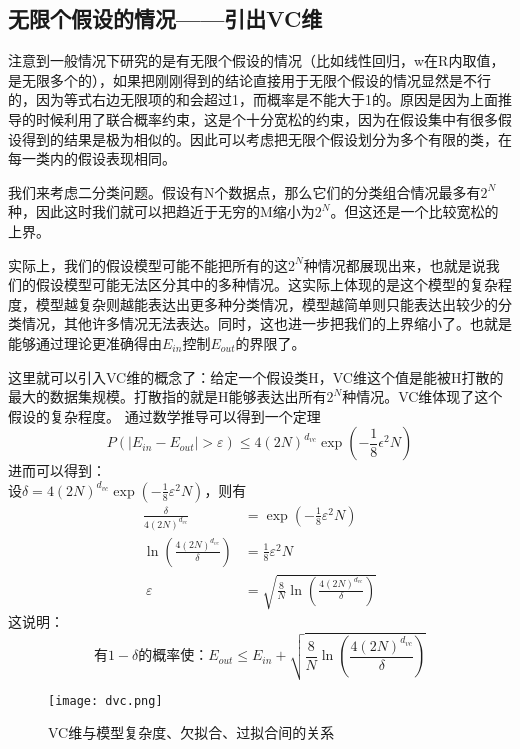 \documentclass[forprint]{report}
\begin{document}
\subsection{无限个假设的情况——引出VC维}
注意到一般情况下研究的是有无限个假设的情况（比如线性回归，w在R内取值，是无限多个的），如果把刚刚得到的结论直接用于无限个假设的情况显然是不行的，因为等式右边无限项的和会超过1，而概率是不能大于1的。原因是因为上面推导的时候利用了联合概率约束，这是个十分宽松的约束，因为在假设集中有很多假设得到的结果是极为相似的。因此可以考虑把无限个假设划分为多个有限的类，在每一类内的假设表现相同。

我们来考虑二分类问题。假设有N个数据点，那么它们的分类组合情况最多有$2^N$种，因此这时我们就可以把趋近于无穷的M缩小为$2^N$。但这还是一个比较宽松的上界。

实际上，我们的假设模型可能不能把所有的这$2^N$种情况都展现出来，也就是说我们的假设模型可能无法区分其中的多种情况。这实际上体现的是这个模型的复杂程度，模型越复杂则越能表达出更多种分类情况，模型越简单则只能表达出较少的分类情况，其他许多情况无法表达。同时，这也进一步把我们的上界缩小了。也就是能够通过理论更准确得由$E_{in}$控制$E_{out}$的界限了。

这里就可以引入VC维的概念了：给定一个假设类H，VC维这个值是能被H打散的最大的数据集规模。打散指的就是H能够表达出所有$2^N$种情况。VC维体现了这个假设的复杂程度。
通过数学推导可以得到一个定理$$
P\left( \left| E_{in}-E_{out} \right|>\varepsilon \right) \leqslant 4\left( 2N \right) ^{d_{vc}}\exp \left( -\frac{1}{8}\epsilon ^2N \right) 
$$进而可以得到：\\
\noindent
设$\delta =4\left( 2N \right) ^{d_{vc}}\exp \left( -\frac{1}{8}\varepsilon ^2N \right)$，则有
$$
\begin{aligned}
\frac{\delta}{4\left( 2N \right) ^{d_{vc}}}&=\exp \left( -\frac{1}{8}\varepsilon ^2N \right) 
\\
\ln \left( \frac{4\left( 2N \right) ^{d_{vc}}}{\delta} \right) &=\frac{1}{8}\varepsilon ^2N
\\
\ \varepsilon &=\sqrt{\frac{8}{N}\ln \left( \frac{4\left( 2N \right) ^{d_{vc}}}{\delta} \right)}
\end{aligned}
$$
这说明：$$
\text{有}1-\delta \text{的概率使：}E_{out}\leqslant E_{in}+\sqrt{\frac{8}{N}\ln \left( \frac{4\left( 2N \right) ^{d_{vc}}}{\delta} \right)}
$$
\begin{figure}[ht]
	\centering
	\texttt{[image: dvc.png]}
	\caption{VC维与模型复杂度、欠拟合、过拟合间的关系}
	\label{fig:1}
\end{figure}
\end{document}
